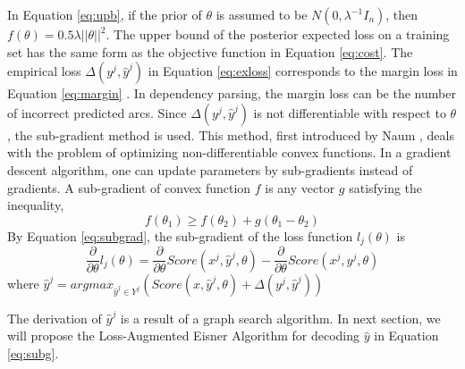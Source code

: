 In Equation \ref{eq:upb}, if the prior of $\theta$ is assumed to be $N(0,\lambda^{-1}I_n)$, then $f(\theta)=0.5\lambda||\theta||^2$. The upper bound of the posterior expected loss on a training set has the same form as the objective function in Equation \ref{eq:cost}. The empirical loss $\Delta(y^j,\hat{y}^j)$ in Equation \ref{eq:exloss} corresponds to the margin loss in Equation \ref{eq:margin} . In dependency parsing, the margin loss can be the number of incorrect predicted arcs. Since $\Delta(y^j,\hat{y}^j)$ is not differentiable with respect to $\theta$, the sub-gradient method is used. This method, first introduced by Naum \cite{shor}, deals with the problem of optimizing non-differentiable convex functions. In a gradient descent algorithm, one can update parameters by sub-gradients instead of gradients. A sub-gradient of convex function $f$ is any vector $g$ satisfying the inequality,
\begin{equation}
\label{eq:subgrad}
f(\theta_1)\geq f(\theta_2)+g(\theta_1-\theta_2)
\end{equation}
By Equation \ref{eq:subgrad}, the sub-gradient of the loss function $l_j(\theta)$ is
\begin{equation}
\label{eq:subg}
\frac{\partial}{\partial\theta}l_j(\theta)=\frac{\partial}{\partial\theta}Score(x^j,\hat{y}^j,\theta)-\frac{\partial}{\partial\theta}Score(x^j,y^j,\theta)
\end{equation}
where $\hat{y}^j =arg max_{\hat{y}^j\in Y^j}(Score(x,\hat{y}^j,\theta)+\Delta(y^j,\hat{y}^j))$


The derivation of $\hat{y}^j$ is a result of a graph search algorithm. In next section, we will propose the Loss-Augmented Eisner Algorithm for decoding $\hat{y}$ in Equation \ref{eq:subg}.

